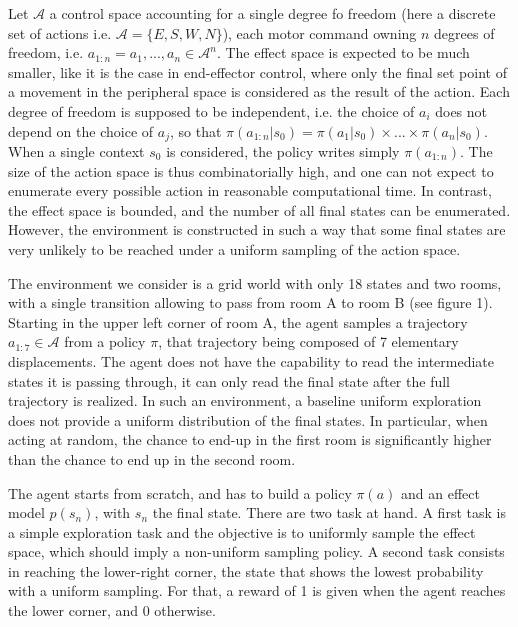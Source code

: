 \documentclass[runningheads]{llncs}
\begin{document}
Let $\mathcal{A}$ a control space accounting for a single degree fo freedom (here a discrete set of actions i.e. $\mathcal{A}=\{E,S,W,N\}$), each motor command owning $n$ degrees of freedom, i.e. $a_{1:n} = {a_1,...,a_n} \in \mathcal{A}^n $. The effect space is expected to be much smaller, like it is the case in end-effector control, where only the final set point of a movement in the peripheral space is considered as the result of the action. Each degree of freedom is supposed to be independent, i.e. the choice of $a_i$ does not depend on the choice of $a_j$, so that $\pi(a_{1:n}|s_0) = \pi(a_1|s_0) \times ... \times \pi(a_n|s_0)$. When a single context $s_0$ is considered, the policy writes simply $\pi(a_{1:n})$.
The size of the action space is thus combinatorially high, and one can not expect to enumerate every possible action in reasonable computational time. 
In contrast, the effect space is bounded, and the number of all final states can be enumerated. However, the environment is constructed in such a way that some final states are very unlikely to be reached under a uniform sampling of the action space.


The environment we consider is a grid world with only 18 states and two rooms, with a single transition allowing to pass from room A to room B (see figure 1). %
Starting in the upper left corner of room A, the agent samples a trajectory $a_{1:7} \in \mathcal{A}$ from a policy $\pi$, that trajectory being composed of 7 elementary displacements. The agent does not have the capability to read the intermediate states it is passing through, it can only read the final state after the full trajectory is realized. 
In such an environment, a baseline uniform exploration does not provide a uniform distribution of the final states. In particular, when acting at random, the chance to end-up in the first room is significantly higher than the chance to end up in the second room.  
    
The agent starts from scratch, and has to build a policy $\pi(a)$ and an effect model $p(s_n)$, with $s_n$ the final state. 
There are two task at hand. A first task is a simple exploration task and the objective is to uniformly sample the effect space, which should imply a non-uniform sampling policy. A second task consists in reaching the lower-right corner, the state that shows the lowest probability with a uniform sampling. For that, a reward of 1 is given when the agent reaches the lower corner, and 0 otherwise.
\end{document}
